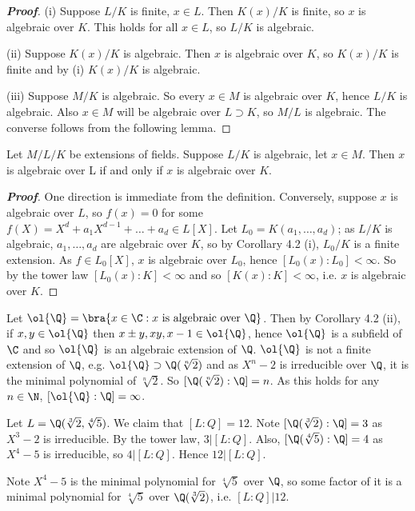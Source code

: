 \begin{proof}[\bf Proof]
\ben
\item [(i)] Suppose $L/K$ is finite, $x \in L$. Then $K(x)/K$ is finite, so $x$ is algebraic over $K$. This holds for all $x \in L$, so $L/K$ is algebraic.
\item [(ii)] Suppose $K(x)/K$ is algebraic. Then $x$ is algebraic over $K$, so $K(x)/K$ is finite and by (i) $K(x)/K$ is algebraic.
\item [(iii)] Suppose $M/K$ is algebraic. So every $x \in M$ is algebraic over $K$, hence $L/K$ is algebraic. Also $x \in M$ will be algebraic over $L \supset K$, so $M/L$ is algebraic. The converse follows from the following lemma.
\een
\end{proof}

\begin{lemma}
Let $M/L/K$ be extensions of fields. Suppose $L/K$ is algebraic, let $x \in M$. Then $x$ is algebraic over L if and only if $x$ is algebraic over $K$.
\end{lemma}

\begin{proof}[\bf Proof]
One direction is immediate from the definition. Conversely, suppose $x$ is algebraic over $L$, so $f(x) = 0$ for some $f(X) = X^d + a_1X^{d-1} + \dots+ a_d \in L[X]$. Let $L_0 = K(a_1, \dots , a_d)$; as $L/K$ is algebraic, $a_1, \dots , a_d$ are algebraic over $K$, so by Corollary 4.2 (i), $L_0/K$ is a finite extension. As $f \in L_0[X]$, $x$ is algebraic over $L_0$, hence $[L_0(x) : L_0] < \infty$. So by the tower law $[L_0(x) : K] < \infty$ and so $[K(x) : K] < \infty$, i.e. $x$ is algebraic over $K$.
\end{proof}

\begin{example}
Let $\ol{\Q} = \bra{x \in \C : x \text{ is algebraic over }\Q}$. Then by Corollary 4.2 (ii), if $x, y \in \ol{\Q}$ then $x \pm y, xy, x-1 \in \ol{\Q}$, hence $\ol{\Q}$ is a subfield of $\C$ and so $\ol{\Q}$ is an algebraic extension of $\Q$. $\ol{\Q}$ is not a finite extension of $\Q$, e.g. $\ol{\Q} \supset \Q(\sqrt[n]{2})$ and as $X^n - 2$ is irreducible over $\Q$, it is the minimal polynomial of $\sqrt[n]{2}$. So $[\Q(\sqrt[n]{2}) : \Q] = n$. As this holds for any $n \in \N$, $[\ol{\Q} : \Q] = \infty$.
\end{example}

\begin{example}
Let $L = \Q( \sqrt[3]{2}, \sqrt[4]{5})$. We claim that $[L : Q] = 12$. Note $[\Q(\sqrt[3]{2}) : \Q] = 3$ as $X^3 - 2$ is irreducible. By the tower law, $3 | [L : Q]$. Also, $[\Q(\sqrt[4]{5}) : \Q] = 4$ as $X^4 - 5$ is irreducible, so $4 | [L : Q]$. Hence $12 | [L : Q]$.

Note $X^4 -5$ is the minimal polynomial for $\sqrt[4]{5}$ over $\Q$, so some factor of it is a minimal polynomial for $\sqrt[4]{5}$ over $\Q( \sqrt[3]{2})$, i.e. $[L : Q] | 12$.
\end{example}

